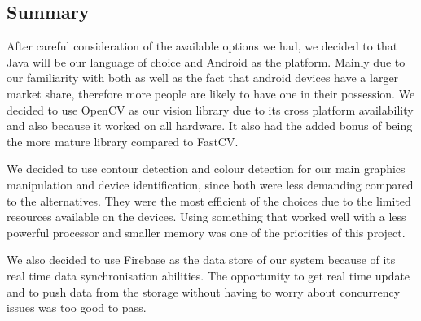 \subsection{Summary}
After careful consideration of the available options we had, we decided to that Java will be our language of choice and Android as the platform. Mainly due to our familiarity with both as well as the fact that android devices have a larger market share, therefore more people are likely to have one in their possession.  We decided to use OpenCV as our vision library due to its cross platform availability and also because it worked on all hardware. It also had the added bonus of being the more mature library compared to FastCV.

We decided to use contour detection and colour detection for our main graphics manipulation and device identification, since both were less demanding compared to the alternatives. They were the most efficient of the choices due to the limited resources available on the devices. Using something that worked well with a less powerful processor and smaller memory was one of the priorities of this project.

We also decided to use Firebase as the data store of our system because of its real time data synchronisation abilities. The opportunity to get real time update and to push data from the storage without having to worry about concurrency issues was too good to pass.